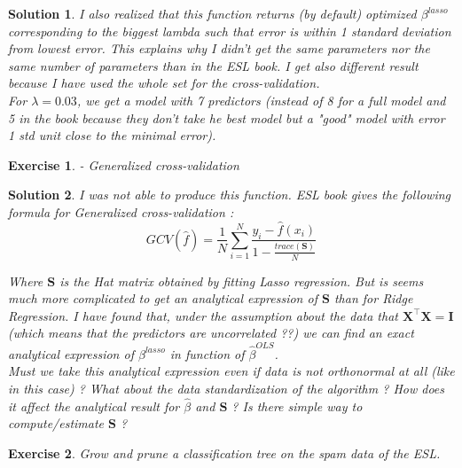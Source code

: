 \documentclass[12pt,a4paper]{article}
\newtheorem{exercise}{Exercise}
\newtheorem{solution}{Solution}
\begin{document}
\begin{solution}
I also realized that this function returns (by default) optimized $\beta^{lasso}$ corresponding to the biggest lambda such that error is within 1 standard deviation from lowest error. This explains why I didn't get the same parameters nor the same number of parameters than in the ESL book. I get also different result because I have used the whole set for the cross-validation.\\

For $\lambda = 0.03$, we get a model with 7 predictors (instead of 8 for a full model and 5 in the book because they don't take he best model but a "good" model with error 1 std unit close to the minimal error).
\end{solution}

\begin{exercise}
- Generalized cross-validation
\end{exercise}

\begin{solution}
I was not able to produce this function. 
ESL book gives the following formula for Generalized cross-validation : $$GCV(\hat f) = \frac{1}{N} \sum_{i=1}^N \frac{y_i - \hat f (x_i)}{1 - \frac{trace(\boldsymbol S)}{N}}$$

Where $\boldsymbol S$ is the Hat matrix obtained by fitting Lasso regression. But is seems much more complicated to get an analytical expression of $\boldsymbol S$ than for Ridge Regression. I have found that, under the assumption about the data that $\boldsymbol X^\top \boldsymbol X = \boldsymbol I$ (which means that the predictors are uncorrelated ??) we can find an exact analytical expression of $\beta^{lasso}$ in function of $ \hat \beta^{OLS}$.\\

Must we take this analytical expression even if data is not orthonormal at all (like in this case) ? What about the data standardization of the algorithm ? How does it affect the analytical result for $\hat \beta$ and $\boldsymbol S$ ? Is there simple way to compute/estimate $\boldsymbol S$ ?
\end{solution}

\begin{exercise}
Grow and prune a classification tree on the spam data of the ESL.
\end{exercise}
\end{document}
